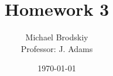 


\title{Homework 3}
\date{\today}
\author{Michael Brodskiy\\ \small Professor: J. Adams}



\maketitle

